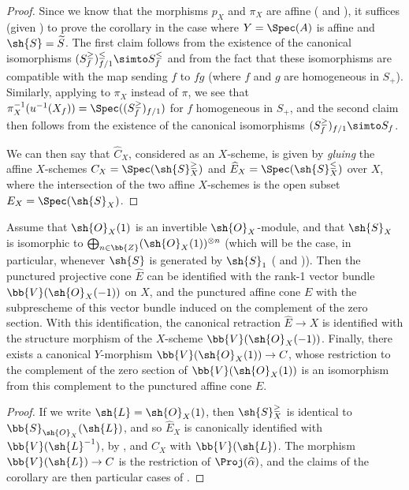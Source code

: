 \begin{proof}
Since we know that the morphisms $p_X$ and $\pi_X$ are affine ( and ), it suffices (given ) to prove the corollary in the case where $Y=\Spec(A)$ is affine and $\sh{S}=\widetilde{S}$.
The first claim follows from the existence of the canonical isomorphisms  $(S_f^\geq)_{f/1}^\leq \simto S_f^\leq$ and from the fact that these isomorphisms are compatible with the map sending $f$ to $fg$ (where $f$ and $g$ are homogeneous in $S_+$).
Similarly, applying  to $\pi_X$ instead of $\pi$, we see that $\pi_X^{-1}(u^{-1}(X_f)) = \Spec((S_f^\geq)_{f/1})$ for $f$ homogeneous in $S_+$, and the second claim then follows from the existence of the canonical isomorphisms  $(S_f^\geq)_{f/1} \simto S_f$.

We can then say that $\widehat{C}_X$, considered as an $X$-scheme, is given by \emph{gluing} the affine $X$-schemes $C_X=\Spec(\sh{S}_X^\geq)$ and $\widehat{E}_X=\Spec(\sh{S}_X^\leq)$ over $X$, where the intersection of the two affine $X$-schemes is the open subset $E_X=\Spec(\sh{S}_X)$.
\end{proof}

\begin{corollary}[8.6.4]
\label{II.8.6.4}
Assume that $\sh{O}_X(1)$ is an invertible $\sh{O}_X$-module, and that $\sh{S}_X$ is isomorphic to $\bigoplus_{n\in\bb{Z}}(\sh{O}_X(1))^{\otimes n}$ (which will be the case, in particular, whenever $\sh{S}$ is generated by $\sh{S}_1$ ( and )).
Then the punctured projective cone $\widehat{E}$ can be identified with the rank-1 vector bundle $\bb{V}(\sh{O}_X(-1))$ on $X$, and the punctured affine cone $E$ with the subprescheme of this vector bundle induced on the complement of the zero section.
With this identification, the canonical retraction $\widehat{E}\to X$ is identified with the structure morphism of the $X$-scheme $\bb{V}(\sh{O}_X(-1))$.
Finally, there exists a canonical $Y$-morphism $\bb{V}(\sh{O}_X(1))\to C$, whose restriction to the complement of the zero section of $\bb{V}(\sh{O}_X(1))$ is an isomorphism from this complement to the punctured affine cone $E$.
\end{corollary}

\begin{proof}
If we write $\sh{L}=\sh{O}_X(1)$, then $\sh{S}_X^\geq$ is identical to $\bb{S}_{\sh{O}_X}(\sh{L})$, and so $\widehat{E}_X$ is canonically identified with $\bb{V}(\sh{L}^{-1})$, by , and $C_X$ with $\bb{V}(\sh{L})$.
The morphism $\bb{V}(\sh{L})\to C$ is the restriction of $\Proj(\widehat{\alpha})$, and the claims of the corollary are then particular cases of .
\end{proof}


